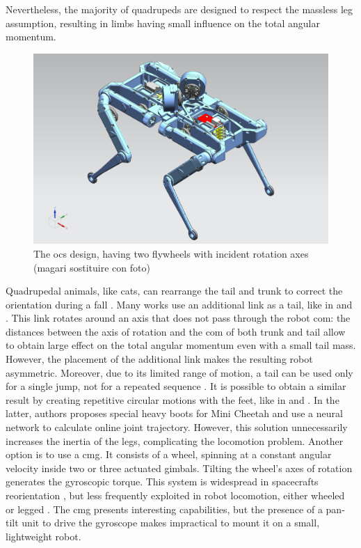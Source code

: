 \documentclass[letterpaper, 10 pt, conference]{ieeeconf}  %
\begin{document}
Nevertheless, the majority of quadrupeds are designed to respect the massless leg assumption, resulting in limbs having small influence on the total angular momentum.

\begin{figure}[t!]
	\centering
	\includegraphics[width=.7\linewidth]{figures/solo_flywheels.png}
	\caption{\small The \gls{ocs} design, having two flywheels with incident rotation axes (magari sostituire con foto)}
	\label{fig:solo12flywheels}
\end{figure} 

Quadrupedal animals, like cats, can rearrange the tail and trunk to correct the orientation during a fall \cite{kane1969dynamical}.
Many works use an additional link as a tail, like in \cite{chu2019null} and \cite{wenger2016frontal}.
This link rotates around an axis that does not pass through the robot \gls{com}: the distances between the axis of rotation and the \gls{com} of both trunk and tail allow to obtain large effect on the total angular momentum even with a small tail mass.
However, the placement of the additional link makes the resulting robot asymmetric. Moreover, due to its limited range of motion, a tail can be used only for a single jump, not for a repeated sequence \cite{johnson2012tail}.
It is possible to obtain a similar result by creating repetitive circular motions with the feet, like in \cite{hoffman2021exploiting} and \cite{kurtz2021mini}. In the latter, authors proposes special heavy boots for Mini Cheetah and use a neural network to calculate online joint trajectory. However, this solution unnecessarily increases the inertia of the legs, complicating the locomotion problem. 
Another option is to use a \gls{cmg}.
It consists of a wheel, spinning at a constant angular velocity inside two or three actuated gimbals.
Tilting the wheel's axes of rotation generates the gyroscopic torque.
This system is widespread in spacecrafts reorientation \cite{yoon2002spacecraft}, but less frequently exploited in robot locomotion, either wheeled \cite{brown1996single} or legged \cite{mikhalkov2021gyrubot}.
The \gls{cmg} presents interesting capabilities, but the presence of a pan-tilt unit to drive the gyroscope makes impractical to mount it on a small, lightweight robot.
\end{document}

